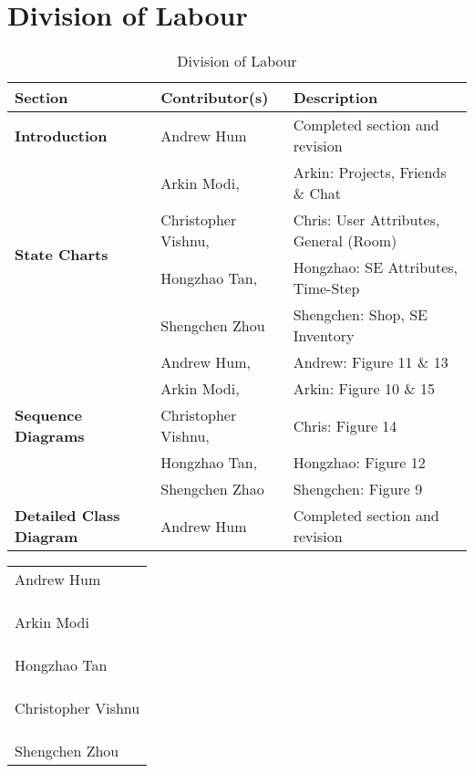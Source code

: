 \documentclass[]{article}
\begin{document}
\section{Division of Labour}
\label{sec:division_of_labour}
\begin{table}[H]
    \centering
    \caption{Division of Labour}
    \begin{tabular}{|p{2.5cm}|p{4cm}|p{9cm}|}
        \hline
        \textbf{Section} & \textbf{Contributor(s)} & \textbf{Description}\\
        \hline
        \textbf{Introduction} & Andrew Hum & Completed section and revision\\
        \hline
        \multirow{4}{2.5cm}{\textbf{State Charts}}  & Arkin Modi,           & Arkin: Projects, Friends \& Chat\\
        ~                                           & Christopher Vishnu,   & Chris: User Attributes, General (Room)\\
        ~                                           & Hongzhao Tan,         & Hongzhao: SE Attributes, Time-Step\\
        ~                                           & Shengchen Zhou        & Shengchen: Shop, SE Inventory\\
        \hline
        \multirow{5}{2.5cm}{\textbf{Sequence Diagrams}} & Andrew Hum,           & Andrew: Figure 11 \& 13\\
        ~                                               & Arkin Modi,           & Arkin: Figure 10 \& 15\\
        ~                                               & Christopher Vishnu,   & Chris: Figure 14\\
        ~                                               & Hongzhao Tan,         & Hongzhao: Figure 12\\
        ~                                               & Shengchen Zhao        & Shengchen: Figure 9\\
        \hline
        \textbf{Detailed Class Diagram} & Andrew Hum & Completed section and revision\\
        \hline
    \end{tabular}
\end{table}

\vspace{2cm}

\begin{table}[H]
    \begin{tabular}{p{5cm}}
    \\
    \hline
    Andrew Hum
    \\\\\\\\
    \hline
    Arkin Modi
    \\\\\\\\
    \hline
    Hongzhao Tan
    \\\\\\\\
    \hline
    Christopher Vishnu
    \\\\\\\\
    \hline
    Shengchen Zhou
    \end{tabular}
\end{table}
\end{document}
